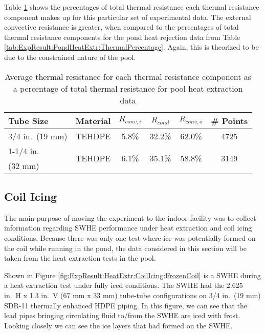 Table \ref{tab:ExpResult:PoolHeatExtr:ThermalPercentage} shows the percentages of total thermal resistance each thermal resistance component makes up for this particular set of experimental data. The external convective resistance is greater, when compared to the percentages of total thermal resistance components for the pond heat rejection data from Table \ref{tab:ExpResult:PondHeatExtr:ThermalPercentage}. Again, this is theorized to be due to the constrained nature of the pool.

	\begin{table}[h]
		\centering
		\caption[Average thermal resistance percentages for pool heat extraction data]{Average thermal resistance for each thermal resistance component as a percentage of total thermal resistance for pool heat extraction data}
		\label{tab:ExpResult:PoolHeatExtr:ThermalPercentage}
		\begin{tabular}{p{3cm} c c c c c}
		\hline
		Tube Size & Material & $R_{conv,i}$ & $R_{cond}$ & $R_{conv,o}$ & \# Points\\
		\hline\hline
		3/4 in.\ (19 mm) & TEHDPE & 5.8\% & 32.2\% & 62.0\% & 4725 \\
		\hline
		1-1/4 in.\ & \multirow{2}{*}{TEHDPE} & \multirow{2}{*}{6.1\%} & \multirow{2}{*}{35.1\%} & \multirow{2}{*}{58.8\%} & \multirow{2}{*}{3149} \\		
		(32 mm) & & & & & \\
		\hline	
		\end{tabular}
	\end{table}	

 
\subsection{Coil Icing}
\label{subsec:ExpResult:HeatExtr:CoilIcing}

The main purpose of moving the experiment to the indoor facility was to collect information regarding SWHE performance under heat extraction and coil icing conditions. Because there was only one test where ice was potentially formed on the coil while running in the pond, the data considered in this section will be taken from the heat extraction tests in the pool.

Shown in Figure \ref{fig:ExpResult:HeatExtr:CoilIcing:FrozenCoil} is a SWHE during a heat extraction test under fully iced conditions. The SWHE had the 2.625 in.\ H x 1.3 in.\ V (67 mm x 33 mm) tube-tube configurations on 3/4 in.\ (19 mm) SDR-11 thermally enhanced HDPE piping. In this figure, we can see that the lead pipes bringing circulating fluid to/from the SWHE are iced with frost. Looking closely we can see the ice layers that had formed on the SWHE.

